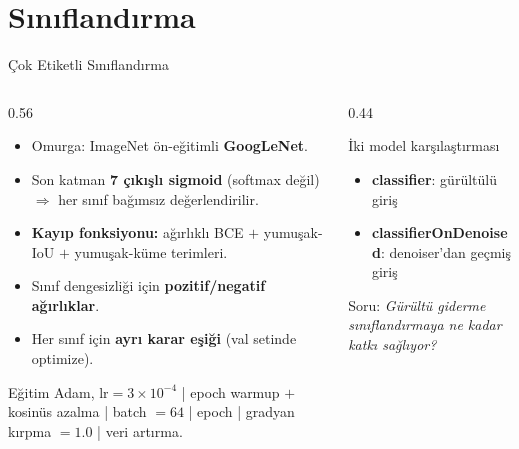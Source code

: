\documentclass[aspectratio=169]{beamer}
\begin{document}
\section{Sınıflandırma}
\begin{frame}{Çok Etiketli Sınıflandırma}
  \begin{columns}[T]
    \begin{column}{0.56\textwidth}
      \begin{itemize}\small
        \item Omurga: ImageNet ön-eğitimli \textbf{GoogLeNet}.
        \item Son katman \textbf{7 çıkışlı sigmoid} (softmax değil)
              $\Rightarrow$ her sınıf bağımsız değerlendirilir.
        \item \textbf{Kayıp fonksiyonu:} ağırlıklı BCE $+$ yumuşak-IoU $+$
              yumuşak-küme terimleri.
        \item Sınıf dengesizliği için \textbf{pozitif/negatif ağırlıklar}.
        \item Her sınıf için \textbf{ayrı karar eşiği} (val setinde optimize).
      \end{itemize}
      \begin{block}{Eğitim}\scriptsize
        Adam, $\text{lr}=3\times10^{-4}$ \;| epoch warmup $+$ kosinüs azalma
        \;|\; batch $=64$ \;| epoch \;|\; gradyan kırpma $=1.0$ \;|\; veri artırma.
      \end{block}
    \end{column}
    \begin{column}{0.44\textwidth}
      \begin{block}{İki model karşılaştırması}\small
        \begin{itemize}
          \item \textbf{classifier}: gürültülü giriş
          \item \textbf{classifierOnDenoised}: denoiser'dan geçmiş giriş
        \end{itemize}
        Soru: \emph{Gürültü giderme sınıflandırmaya ne kadar katkı sağlıyor?}
      \end{block}
    \end{column}
  \end{columns}
\end{frame}
\end{document}
